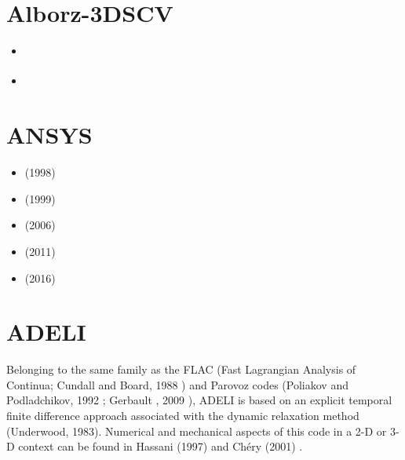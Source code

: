 \section{Alborz-3DSCV} 

\begin{small}
\begin{itemize}
\item[2015] \textcite{shpe15} 
\item[2023] \textcite{shpy23}
\end{itemize}
\end{small}

\section{ANSYS} 

\begin{small}
\begin{itemize}
\item \textcite{mafs98} (1998)
\item \textcite{mafs99} (1999)
\item \textcite{nehe06} (2006)
\item \textcite{jabm11} (2011)
\item \textcite{guyr16} (2016)
\end{itemize}
\end{small}

\section{ADELI} 

Belonging to the same family as the FLAC 
(Fast Lagrangian Analysis of Continua; Cundall and Board, 1988 \cite{cubo88}) 
and Parovoz codes 
(Poliakov and Podladchikov, 1992 \cite{popo92}; Gerbault \etal, 2009 \cite{gecm09}), 
ADELI is based on an explicit temporal
finite difference approach associated with the dynamic relaxation method (Underwood, 1983). 
Numerical and mechanical aspects of this code in a 2-D or 3-D context can be 
found in Hassani \etal (1997) \cite{hajc97} and Ch\'ery \etal (2001) \cite{chzh01}.

